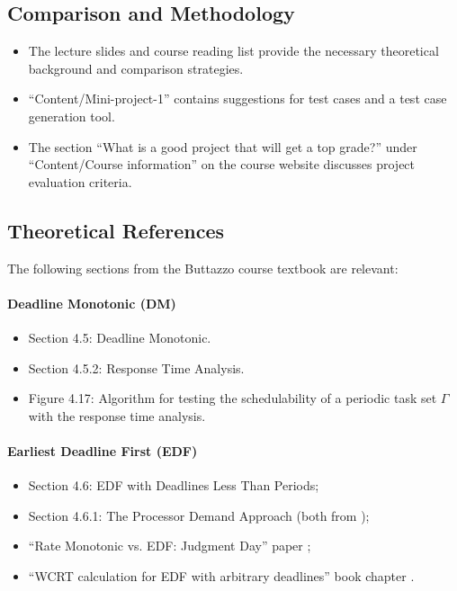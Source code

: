 \documentclass[a4paper,11pt]{article}
\begin{document}
\subsection*{Comparison and Methodology}
\begin{itemize}
    \item The lecture slides and course reading list provide the necessary theoretical background and comparison strategies.
    \item ``Content/Mini-project-1'' contains suggestions for test cases and a test case generation tool.
    \item The section ``What is a good project that will get a top grade?'' under ``Content/Course information'' on the course website discusses project evaluation criteria.
\end{itemize}

\subsection*{Theoretical References}
The following sections from the Buttazzo course textbook \cite{buttazzo2024} are relevant:

\paragraph{Deadline Monotonic (DM)}
\begin{itemize}
    \item Section 4.5: Deadline Monotonic.
    \item Section 4.5.2: Response Time Analysis.
    \item Figure 4.17: Algorithm for testing the schedulability of a periodic task set $\Gamma$ with the response time analysis.
\end{itemize}

\paragraph{Earliest Deadline First (EDF)}
\begin{itemize}
    \item Section 4.6: EDF with Deadlines Less Than Periods;
    \item Section 4.6.1: The Processor Demand Approach (both from \cite{buttazzo2024});
    \item ``Rate Monotonic vs. EDF: Judgment Day'' paper \cite{buttazzo2005};
    \item ``WCRT calculation for EDF with arbitrary deadlines'' book chapter \cite{stankovic1998}.
\end{itemize}
\end{document}
